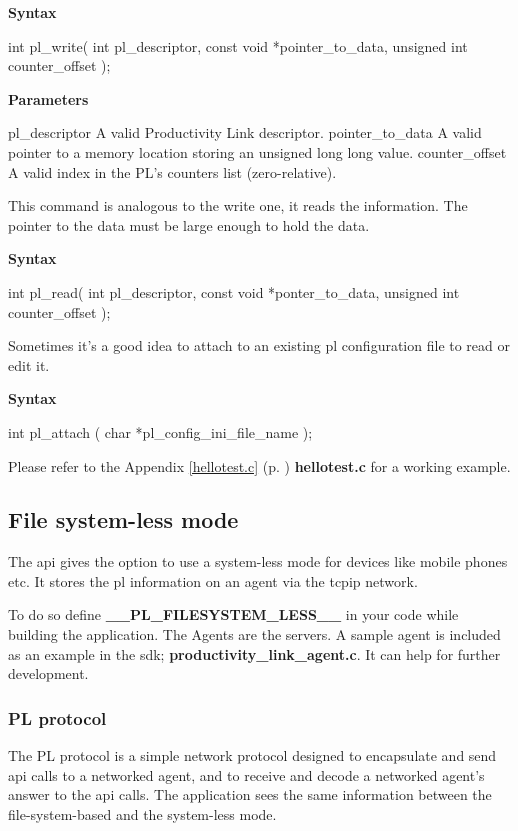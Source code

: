 \textbf{Syntax}
\begin{codelisting}
int pl_write(
	int pl_descriptor,
	const void *pointer_to_data,
	unsigned int counter_offset
);
\end{codelisting}

\textbf{Parameters}
\begin{codelisting}
pl_descriptor 	A valid Productivity Link descriptor.
pointer_to_data	A valid pointer to a memory location storing an unsigned long long value.
counter_offset	A valid index in the PL's counters list (zero-relative).
\end{codelisting}
This command is analogous to the write one, it reads the information. The pointer to the data must be large enough to hold the data.

\textbf{Syntax}
\begin{codelisting}
int pl_read(
	int pl_descriptor,
	const void *ponter_to_data,
	unsigned int counter_offset
);
\end{codelisting}
Sometimes it's a good idea to attach to an existing pl configuration file to read or edit it.

\textbf{Syntax}
\begin{codelisting}
int pl_attach (
	char *pl_config_ini_file_name
);
\end{codelisting}
Please refer to the Appendix \ref{hellotest.c} (p. \pageref{hellotest.c}) \textbf{hellotest.c} for a working example.

\subsection{File system-less mode}
The \gls{api} gives the option to use a system-less mode for devices like mobile phones etc. It stores the \gls{pl} information on an agent via the \gls{tcpip} network.

To do so define \textbf{\_\_PL\_FILESYSTEM\_LESS\_\_} in your code while building the application. The Agents are the servers. 
A sample agent is included as an example in the \gls{sdk}; \textbf{productivity\_link\_agent.c}. It can help for further development.
\subsubsection{PL protocol}
The PL protocol is a simple network protocol designed to encapsulate and send \gls{api} calls to a networked agent, and to receive and decode a networked agent's answer to the \gls{api} calls. The application sees the same information between the file-system-based and the system-less mode. 

